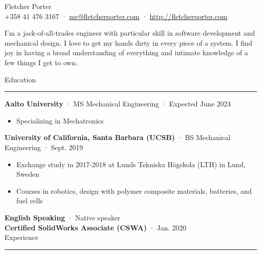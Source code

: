 \documentclass[12pt, oneside]{article}
\newcommand{\titlestyle}[1] {
	{\fontsize{40pt}{1em}\selectfont \textcolor{new_red}{\textsf{#1}}} \\
}
\newcommand{\headingstyleJobs}[1] {
	{\fontsize{18pt}{1em}\selectfont \textcolor{new_red}{\textsf{#1}}}
	\textcolor{new_red}{\rule{3.25in}{0.5pt}} \vspace{3pt}
}
\newcommand{\infostyle}[1] {
	{\selectfont #1} \\ %
}
\newcommand{\jobtitle}[3] {
	{\bf #1} · {#2} · {#3} \vspace{-7pt} \\
}
\newcommand{\certification}[2] {
	{\bf #1} · {#2} \vspace{5pt} \\
}
\renewenvironment{quote}{%
  \list{}{%
    \leftmargin4pt
    \rightmargin\leftmargin
  }
  \item\relax
}
{\endlist}
\newcommand{\overview}[1] {
	\begin{quote}
		#1
	\end{quote}
}
\begin{document}
\begin{flushleft}



\titlestyle{Fletcher Porter}
\infostyle{+358 41 476 3167 · \href{mailto:me@fletcherporter.com}{me@fletcherporter.com} · \url{http://fletcherporter.com}}

\overview{
I'm a jack-of-all-trades engineer with particular skill in software
development and mechanical design.  I love to get my hands dirty in every piece
of a system.  I find joy in having a broad understanding of everything and
intimate knowledge of a few things I get to own.
}

\headingstyleJobs{Education}

\jobtitle{Aalto University}{MS Mechanical Engineering}{Expected June 2024}
\begin{itemize}
    \item Specializing in Mechatronics
\end{itemize}

\jobtitle{University of California, Santa Barbara (UCSB)}{BS Mechanical Engineering}{Sept. 2019}
\begin{itemize}
	\item Exchange study in 2017-2018 at Lunds Tekniska Högskola (LTH) in Lund, Sweden \\
	\item Courses in robotics, design with polymer composite materials, batteries, and fuel cells
\end{itemize}


\certification{English Speaking}{Native speaker}

\certification{Certified SolidWorks Associate (CSWA)}{Jan. 2020}


\headingstyleJobs{Experience}


\end{flushleft}
\end{document}
